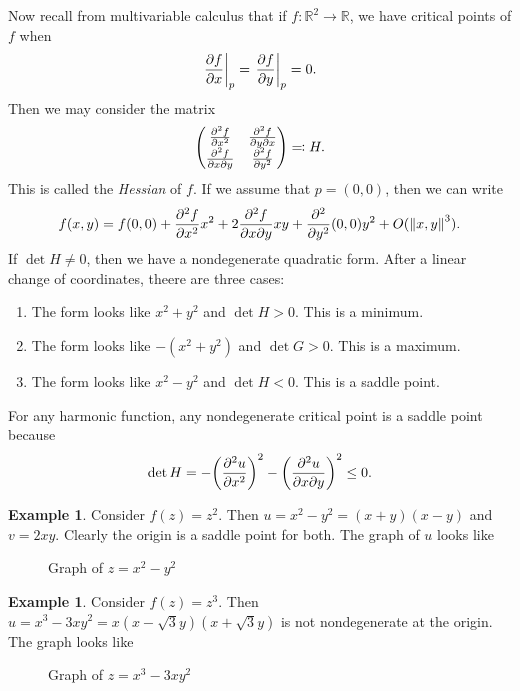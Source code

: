\documentclass[leqno, openany]{memoir}
\theoremstyle{definition}
\newtheorem{exm}[thm]{Example}
\theoremstyle{remark}
\theoremstyle{plain}
\theoremstyle{definition}
\theoremstyle{remark}
\newcommand{\R}{\mathbb{R}}
\begin{document}
Now recall from multivariable calculus that if $f \colon \R^2 \to \R$, we have critical points of $f$ when 
\[ \eval{ \pdv{f}{x} }_p = \eval{\pdv{f}{y}}_p = 0. \]
Then we may consider the matrix
\[ \mqty( \pdv[2]{f}{x} & \pdv{f}{y}{x} \\ \pdv{f}{x}{y} & \pdv[2]{f}{y} ) \eqqcolon H. \]
This is called the \textit{Hessian} of $f$. If we assume that $p = (0,0)$, then we can write
\[ f(x,y) = f(0,0) + \pdv[2]{f}{x}(0,0) x^2 + 2 \pdv{f}{x}{y} (0,0) xy + \pdv[2]{y}(0,0) y^2 + O(\norm{x,y}^3). \]
If $\det H \neq 0$, then we have a nondegenerate quadratic form. After a linear change of coordinates, theere are three cases:
\begin{enumerate}
    \item The form looks like $x^2 + y^2$ and $\det H > 0$. This is a minimum.
    \item The form looks like $-(x^2 + y^2)$ and $\det G > 0$. This is a maximum.
    \item The form looks like $x^2 - y^2$ and $\det H < 0$. This is a saddle point.
\end{enumerate}
For any harmonic function, any nondegenerate critical point is a saddle point because
\[ \det H = - {\qty(\pdv[2]{u}{x})}^2 - {\qty(\pdv{u}{x}{y})}^2 \leq 0. \]
\begin{exm}
    Consider $f(z) = z^2$. Then $u = x^2 - y^2 = (x+y)(x-y)$ and $v = 2xy$. Clearly the origin is a saddle point for both. The graph of $u$ looks like
    \begin{figure}[H]
    \begin{center}
    \end{center}
    \caption{Graph of $z = x^2 - y^2$}%
    \label{fig:graph}
    \end{figure}
\end{exm}

\begin{exm}
    Consider $f(z) = z^3$. Then $u = x^3 - 3xy^2 = x(x-\sqrt{3}y)(x+\sqrt{3}y)$ is not nondegenerate at the origin. The graph looks like
    \begin{figure}[H]
    \begin{center}
    \end{center}
    \caption{Graph of $z = x^3 - 3xy^2$}%
    \label{fig:graph-2}
    \end{figure}
\end{exm}
\end{document}
